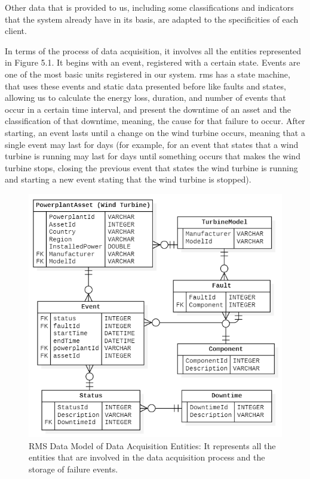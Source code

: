 Other data that is provided to us, including some classifications and indicators that the system already have in its basis, are adapted to the specificities of each client.

In terms of the process of data acquisition, it involves all the entities represented in Figure 5.1. It begins with an event, registered with a certain state. Events are one of the most basic units registered in our system. \acrshort{rms} has a state machine, that uses these events and static data presented before like faults and states, allowing us to calculate the energy loss, duration, and number of events that occur in a certain time interval, and present the downtime of an asset and the classification of that downtime, meaning, the cause for that failure to occur. After starting, an event lasts until a change on the wind turbine occurs, meaning that a single event may last for days (for example, for an event that states that a wind turbine is running may last for days until  something occurs that makes the wind turbine stops, closing the previous event that states the wind turbine is running and starting a new event stating that the wind turbine is stopped).

\begin{figure}[htbp]
	\centering
	\includegraphics[scale=0.7]{Chapters/Figures/methodology_fig10.png}
	\caption{RMS Data Model of Data Acquisition Entities: It represents all the entities that are involved in the data acquisition process and the storage of failure events.}
	\label{fig:Figuras_Tree_silhouettes-vectorial}
\end{figure}

